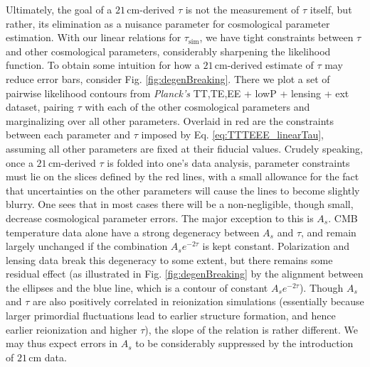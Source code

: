 \documentclass[twocolumn,aps,prd,nofootinbib,showpacs,superscriptaddress]{revtex4-1}
\begin{document}
Ultimately, the goal of a $21\,\textrm{cm}$-derived $\tau$ is not the measurement of $\tau$ itself, but rather, its elimination as a nuisance parameter for cosmological parameter estimation. With our linear relations for $\tau_\textrm{sim}$, we have tight constraints between $\tau$ and other cosmological parameters, considerably sharpening the likelihood function. To obtain some intuition for how a $21\,\textrm{cm}$-derived estimate of $\tau$ may reduce error bars, consider Fig. \ref{fig:degenBreaking}. There we plot a set of pairwise likelihood contours from \emph{Planck's} TT,TE,EE + lowP + lensing + ext dataset, pairing $\tau$ with each of the other cosmological parameters and marginalizing over all other parameters. Overlaid in red are the constraints between each parameter and $\tau$ imposed by Eq. \eqref{eq:TTTEEE_linearTau}, assuming all other parameters are fixed at their fiducial values. Crudely speaking, once a $21\,\textrm{cm}$-derived $\tau$ is folded into one's data analysis, parameter constraints must lie on the slices defined by the red lines, with a small allowance for the fact that uncertainties on the other parameters will cause the lines to become slightly blurry. One sees that in most cases there will be a non-negligible, though small, decrease cosmological parameter errors. The major exception to this is $A_s$. CMB temperature data alone have a strong degeneracy between $A_s$ and $\tau$, and remain largely unchanged if the combination $A_s e^{-2 \tau}$ is kept constant. Polarization and lensing data break this degeneracy to some extent, but there remains some residual effect (as illustrated in Fig. \ref{fig:degenBreaking} by the alignment between the ellipses and the blue line, which is a contour of constant $A_s e^{-2 \tau}$). Though $A_s$ and $\tau$ are also positively correlated in reionization simulations (essentially because larger primordial fluctuations lead to earlier structure formation, and hence earlier reionization and higher $\tau$), the slope of the relation is rather different. We may thus expect errors in $A_s$ to be considerably suppressed by the introduction of $21\,\textrm{cm}$ data.
\end{document}
